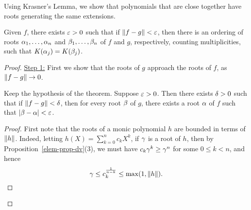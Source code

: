 Using Krasner's Lemma, we show that polynomials that are close together have roots generating the same extensions.
\begin{thm}
Given $f$, there exists $\varepsilon>0$ such that if $\left\Vert {f-g}\right\Vert<\varepsilon$, then there is an ordering of roots $\alpha_1,\ldots, \alpha_n$ and $\beta_1,\ldots, \beta_n$ of $f$ and $g$, respectively, counting multiplicities, such that $K(\alpha_j)=K(\beta_j)$.
\end{thm}
\begin{proof}
\noindent\underline{Step 1:} First we show that the roots of $g$ approach the roots of $f$, as $\left\Vert {f-g}\right\Vert\to 0$.
\begin{lem}
Keep the hypothesis of the theorem. Suppose $\varepsilon>0$. Then there exists $\delta>0$ such that if $\left\Vert {f-g}\right\Vert<\delta$, then for every root $\beta$ of $g$, there exists a root $\alpha$ of $f$ such that $|\beta-\alpha|<\varepsilon$.
\end{lem}
\begin{proof}
First note that the roots of a monic polynomial $h$ are bounded in terms of $\left\Vert {h}\right\Vert$. Indeed, letting $h(X)=\sum_{k=0}^n c_kX^k$, if $\gamma$ is a root of $h$, then by Proposition~\ref{elem-prop-dv}(3), we must have $c_k\gamma^k \ge \gamma^n$ for some $0\le k<n$, and hence
\[
\gamma\le c_k^{\frac{1}{n-k}}\le \max(1,\left\Vert {h}\right\Vert).
\]


\end{proof}
\end{proof}
